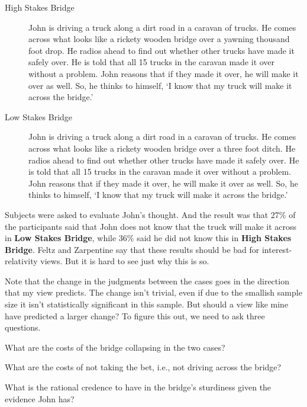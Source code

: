 \begin{description}
\item[High Stakes Bridge] John is driving a truck along a dirt road in a caravan of trucks. He comes across what looks like a rickety wooden bridge over a yawning thousand foot drop. He radios ahead to find out whether other trucks have made it safely over. He is told that all 15 trucks in the caravan made it over without a problem. John reasons that if they made it over, he will make it over as well. So, he thinks to himself, `I know that my truck will make it across the bridge.'

\item[Low Stakes Bridge] John is driving a truck along a dirt road in a caravan of trucks. He comes across what looks like a rickety wooden bridge over a three foot ditch. He radios ahead to find out whether other trucks have made it safely over. He is told that all 15 trucks in the caravan made it over without a problem. John reasons that if they made it over, he will make it over as well. So, he thinks to himself, `I know that my truck will make it across the bridge.' \citep[??]{FeltzZarpentine2010}
\end{description}

\noindent Subjects were asked to evaluate John's thought. And the result was that 27\% of the participants said that John does not know that the truck will make it across in \textbf{Low Stakes Bridge}, while 36\% said he did not know this in \textbf{High Stakes Bridge}. Feltz and Zarpentine say that these results should be bad for interest-relativity views. But it is hard to see just why this is so.

Note that the change in the judgments between the cases goes in the direction that my view predicts. The change isn't trivial, even if due to the smallish sample size it isn't statistically significant in this sample. But should a view like mine have predicted a larger change? To figure this out, we need to ask three questions.

\begin{enumerate*}
\item What are the costs of the bridge collapsing in the two cases?
\item What are the costs of not taking the bet, i.e., not driving across the bridge?
\item What is the rational credence to have in the bridge's sturdiness given the evidence John has?
\end{enumerate*}

